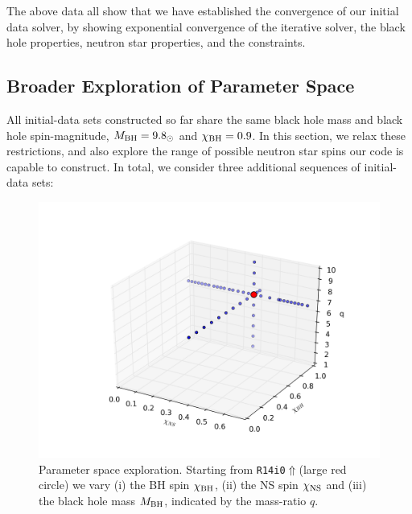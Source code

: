 The above data all show that we have established the convergence of
our initial data solver, by showing exponential convergence of the
iterative solver, the black hole properties, neutron star properties,
and the constraints.

\subsection{Broader Exploration of Parameter Space}
\label{sec:MoreParameters}


All initial-data sets constructed so far share the same black hole
mass and black hole spin-magnitude, $M_{\rm BH}=9.8_\odot$
and $\chi_{\rm BH}=0.9$. In this section, we relax these
restrictions, and also explore the range of possible neutron star
spins our code is capable to construct. In total, we consider three additional sequences of initial-data sets:

\begin{figure}
\centerline{\includegraphics[width=0.95\columnwidth]{chap4/3dparam.png}}
\caption[3d parameter space plot of BH-NS initial data
  sets.]{\label{fig:3dparam} Parameter space exploration. Starting
  from {\tt R14i0$\Uparrow$}(large red circle) we vary (i) the BH
  spin $\chi_{\rm BH}$, (ii) the NS spin $\chi_{\rm NS}$ and (iii) the
  black hole mass $M_{\rm BH}$, indicated by the mass-ratio $q$.}
\end{figure}


